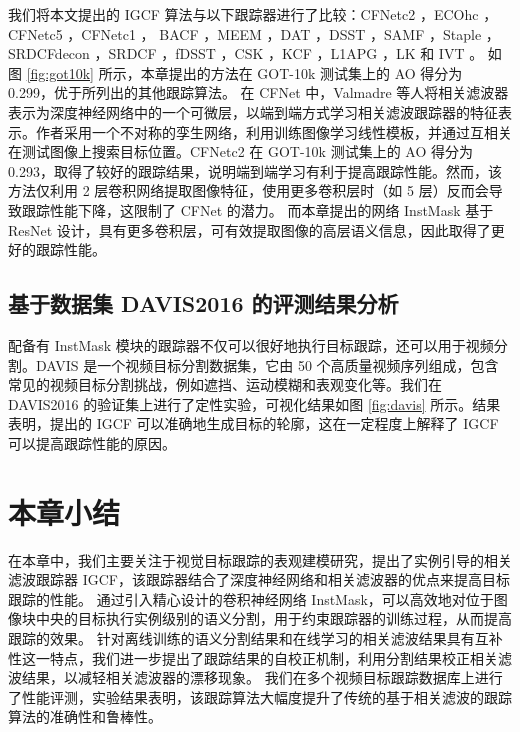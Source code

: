 我们将本文提出的 IGCF 算法与以下跟踪器进行了比较：CFNetc2 \cite{Valmadre2017EndtoEndRL}，ECOhc \cite{danelljan2017eco}，CFNetc5 \cite{Valmadre2017EndtoEndRL}，CFNetc1 \cite{Valmadre2017EndtoEndRL}， BACF \cite{Galoogahi2017LearningBC}，MEEM \cite{Zhang2014MEEMRT}，DAT \cite{Possegger2015InDO}，DSST \cite{Danelljan2014AccurateSE}，SAMF \cite{Li2014ASA}，Staple \cite{Bertinetto2016StapleC}，SRDCFdecon \cite{Danelljan2016AdaptiveDO}，SRDCF \cite{Danelljan2015LearningSR}，fDSST \cite{Danelljan2017DiscriminativeSS}，CSK \cite{Henriques2012ExploitingTC}，KCF \cite{henriques2014high-speed}，L1APG \cite{Bao2012RealTR}，LK \cite{Shi1994GoodFT} 和 IVT \cite{Ross2007IncrementalLF}。
如图 \ref{fig:got10k} 所示，本章提出的方法在 GOT-10k 测试集上的 AO 得分为 0.299，优于所列出的其他跟踪算法。
在 CFNet \cite{Valmadre2017EndtoEndRL} 中，Valmadre 等人将相关滤波器表示为深度神经网络中的一个可微层，以端到端方式学习相关滤波跟踪器的特征表示。作者采用一个不对称的孪生网络，利用训练图像学习线性模板，并通过互相关在测试图像上搜索目标位置。CFNetc2 在 GOT-10k 测试集上的 AO 得分为 0.293，取得了较好的跟踪结果，说明端到端学习有利于提高跟踪性能。然而，该方法仅利用 2 层卷积网络提取图像特征，使用更多卷积层时（如 5 层）反而会导致跟踪性能下降，这限制了 CFNet 的潜力。
而本章提出的网络 InstMask 基于 ResNet 设计，具有更多卷积层，可有效提取图像的高层语义信息，因此取得了更好的跟踪性能。

\subsection{基于数据集 DAVIS2016 的评测结果分析}
配备有 InstMask 模块的跟踪器不仅可以很好地执行目标跟踪，还可以用于视频分割。DAVIS \cite{Perazzi2016} 是一个视频目标分割数据集，它由 50 个高质量视频序列组成，包含常见的视频目标分割挑战，例如遮挡、运动模糊和表观变化等。我们在 DAVIS2016 的验证集上进行了定性实验，可视化结果如图 \ref{fig:davis} 所示。结果表明，提出的 IGCF 可以准确地生成目标的轮廓，这在一定程度上解释了 IGCF 可以提高跟踪性能的原因。

\section{本章小结}
在本章中，我们主要关注于视觉目标跟踪的表观建模研究，提出了实例引导的相关滤波跟踪器 IGCF，该跟踪器结合了深度神经网络和相关滤波器的优点来提高目标跟踪的性能。
通过引入精心设计的卷积神经网络 InstMask，可以高效地对位于图像块中央的目标执行实例级别的语义分割，用于约束跟踪器的训练过程，从而提高跟踪的效果。
针对离线训练的语义分割结果和在线学习的相关滤波结果具有互补性这一特点，我们进一步提出了跟踪结果的自校正机制，利用分割结果校正相关滤波结果，以减轻相关滤波器的漂移现象。
我们在多个视频目标跟踪数据库上进行了性能评测，实验结果表明，该跟踪算法大幅度提升了传统的基于相关滤波的跟踪算法的准确性和鲁棒性。